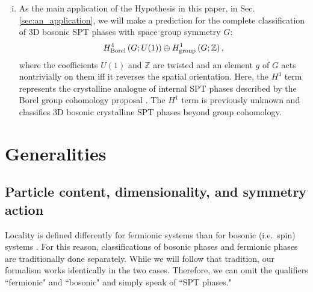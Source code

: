 \documentclass[sort&compress]{elsarticle}
\theoremstyle{theoremstyle}
\theoremstyle{framedtheoremstyle}
\theoremstyle{definitionstyle}
\theoremstyle{definitionstyle}
\theoremstyle{definitionstyle}
\theoremstyle{definitionstyle}
\theoremstyle{nameddefinitionstyle}
\theoremstyle{framednameddefinitionstyle}
\theoremstyle{proofstyle}
\theoremstyle{definitionstyle}
\newcommand{\ZZZ}{\mathbb{Z}}
\newcommand{\paren}[1]{\left( #1 \right)}
\begin{document}
\begin{enumerate}[(i)]
\item As the main application of the Hypothesis in this paper, in Sec.\,\ref{sec:an_application}, we will make a prediction for the complete classification of 3D bosonic SPT phases with space group symmetry $G$:
\begin{equation}
    H^4_{\rm Borel}\paren{G;U(1)} \oplus H^1_{\rm group}\paren{G;\ZZZ},
\end{equation}
where the coefficients $U(1)$ and $\ZZZ$ are twisted and an element $g$ of $G$ acts nontrivially on them iff it reverses the spatial orientation. Here, the $H^4$ term represents the crystalline analogue \cite{Huang_dimensional_reduction, Thorngren_sgSPT} of internal SPT phases described by the Borel group cohomology proposal \cite{Wen_Boson}. The $H^1$ term is previously unknown and classifies 3D bosonic crystalline SPT phases beyond group cohomology.

\end{enumerate}















\section{Generalities\label{sec:generalities}}





\subsection{Particle content, dimensionality, and symmetry action\label{subsec:particle_content_dimensionality_symmetry_action}}

Locality is defined differently for fermionic systems than for bosonic (i.e.\ spin) systems \cite{Wen_Fermion_vs_Boson}.
For this reason, classifications of bosonic phases and fermionic phases are traditionally done separately. While we will follow that tradition, our formalism works identically in the two cases. Therefore, we can omit the qualifiers ``fermionic" and ``bosonic" and simply speak of ``SPT phases."
\end{document}
